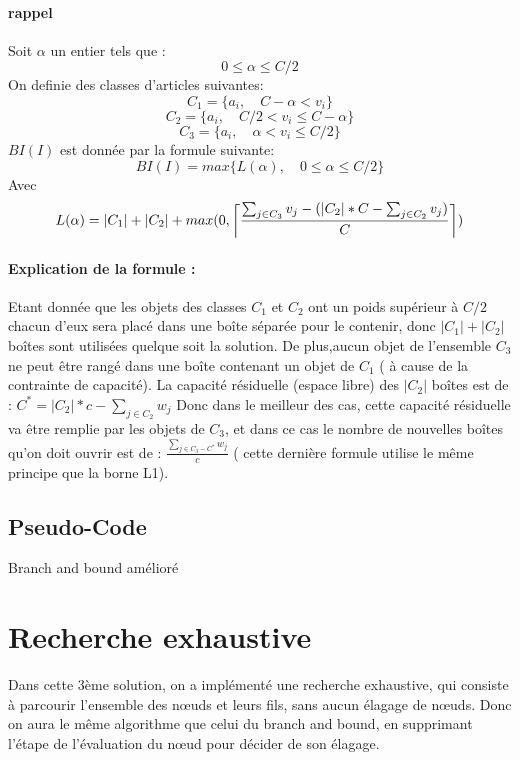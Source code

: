 \documentclass[12pt]{article}
\DeclarePairedDelimiter\ceil{\lceil}{\rceil}
\begin{document}
\paragraph{rappel}
Soit \(\alpha\) un entier tels que :
\[0 \le \alpha \le C/2\]
On definie des classes d'articles suivantes: 
\[C_1 = \{a_i, \quad C-\alpha < v_i\} \]
\[C_2 = \{a_i, \quad C/2 < v_i \le C-\alpha\} \]
\[C_3 = \{a_i, \quad \alpha < v_i \le C/2\} \]
\(BI(I)\)  est donnée par la formule suivante:
\[BI(I)=max\{L(\alpha),\quad 0 \le \alpha \le C/2\}\]
Avec
\[L(\alpha)=|C_1|+|C_2|+max(0, \ceil*{\frac{\sum_{j \in C_3}^{} v_j - (|C_2|*C - \sum_{j \in C_2}^{} v_j) }{C}})\]
\paragraph{Explication de la formule :}
Etant donnée que les objets des classes $C_1$ et $C_2$ ont un poids supérieur à $C/2$ chacun d'eux sera placé dans une boîte séparée pour le contenir, donc
$|C_1|+|C_2|$boîtes sont utilisées quelque soit la solution. De plus,aucun objet de l’ensemble $C_3$ ne peut être rangé dans une boîte contenant un objet de $C_1$ ( à cause de la contrainte de capacité). La capacité résiduelle (espace libre) des
$|C_2|$ boîtes est de : $C^*=|C_2|*c-\sum_{j \in C_2}^{} w_j$
Donc dans le meilleur des cas, cette capacité résiduelle va être remplie par les objets de $C_3$, et dans ce cas le nombre de nouvelles boîtes qu’on doit ouvrir est de :  
$\frac{\sum_{j \in C_3 -C^*}^{} w_j}{c}$ ( cette dernière formule utilise le même principe que la borne L1).
\subsection{Pseudo-Code}
\begin{algorithm}
   \caption{Branch and bound amélioré }
    
\end{algorithm}
\section{Recherche exhaustive }
Dans cette 3ème solution, on a implémenté une recherche exhaustive, qui consiste à parcourir l’ensemble des nœuds et leurs fils, sans aucun élagage de nœuds. Donc on aura le même algorithme que celui du branch and bound, en supprimant l’étape de l’évaluation du nœud pour décider de son élagage.  
\end{document}
